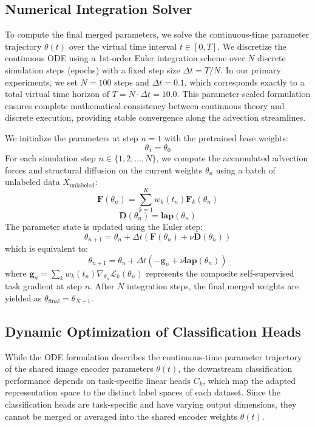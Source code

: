 \subsection{Numerical Integration Solver}
To compute the final merged parameters, we solve the continuous-time parameter trajectory $\theta(t)$ over the virtual time interval $t \in [0, T]$. We discretize the continuous ODE using a 1st-order Euler integration scheme over $N$ discrete simulation steps (epochs) with a fixed step size $\Delta t = T / N$. In our primary experiments, we set $N=100$ steps and $\Delta t = 0.1$, which corresponds exactly to a total virtual time horizon of $T = N \cdot \Delta t = 10.0$. This parameter-scaled formulation ensures complete mathematical consistency between continuous theory and discrete execution, providing stable convergence along the advection streamlines.

We initialize the parameters at step $n=1$ with the pretrained base weights:
\begin{equation}
    \theta_1 = \theta_0
\end{equation}
For each simulation step $n \in \{1, 2, \dots, N\}$, we compute the accumulated advection forces and structural diffusion on the current weights $\theta_n$ using a batch of unlabeled data $X_{\text{unlabeled}}$:
\begin{equation}
    \mathbf{F}(\theta_n) = \sum_{k=1}^K w_k(t_n) \mathbf{F}_k(\theta_n)
\end{equation}
\begin{equation}
    \mathbf{D}(\theta_n) = \mathbf{lap}(\theta_n)
\end{equation}
The parameter state is updated using the Euler step:
\begin{equation}
    \theta_{n+1} = \theta_n + \Delta t \left( \mathbf{F}(\theta_n) + \nu \mathbf{D}(\theta_n) \right)
\end{equation}
which is equivalent to:
\begin{equation}
    \theta_{n+1} = \theta_n + \Delta t \left( -\mathbf{g}_n + \nu \mathbf{lap}(\theta_n) \right)
\end{equation}
where $\mathbf{g}_n = \sum_k w_k(t_n) \nabla_{\theta_n} \mathcal{L}_k(\theta_n)$ represents the composite self-supervised task gradient at step $n$. After $N$ integration steps, the final merged weights are yielded as $\theta_{\text{final}} = \theta_{N+1}$.

\subsection{Dynamic Optimization of Classification Heads}
\label{subsec:classification_heads}
While the ODE formulation describes the continuous-time parameter trajectory of the shared image encoder parameters $\theta(t)$, the downstream classification performance depends on task-specific linear heads $C_k$, which map the adapted representation space to the distinct label spaces of each dataset. Since the classification heads are task-specific and have varying output dimensions, they cannot be merged or averaged into the shared encoder weights $\theta(t)$.

